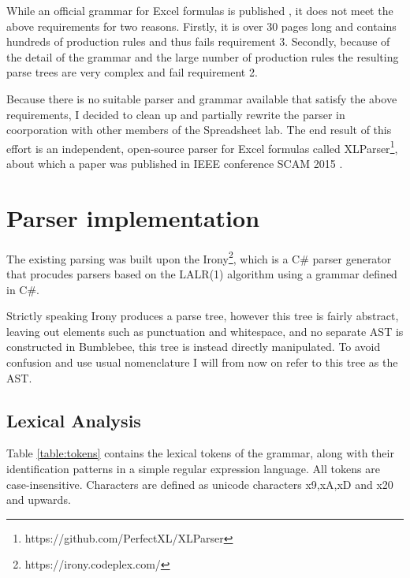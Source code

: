 While an official grammar for Excel formulas is published \cite{ExcelOfficialGrammar}, it does not meet the above requirements for two reasons.
Firstly, it is over 30 pages long and contains hundreds of production rules and thus fails requirement 3.
Secondly, because of the detail of the grammar and the large number of production rules the resulting parse trees are very complex and fail requirement 2.

Because there is no suitable parser and grammar available that satisfy the above requirements, I decided to clean up and partially rewrite the parser in coorporation with other members of the Spreadsheet lab.
The end result of this effort is an independent, open-source parser for Excel formulas called XLParser\footnote{https://github.com/PerfectXL/XLParser}, about which a paper was published in IEEE conference SCAM 2015 \cite{xlparser}.

\section{Parser implementation}

The existing parsing was built upon the Irony\footnote{https://irony.codeplex.com/}, which is a C\# parser generator that procudes parsers based on the LALR(1) algorithm using a grammar defined in C\#.

Strictly speaking Irony produces a parse tree, however this tree is fairly abstract, leaving out elements such as punctuation and whitespace, and no separate AST is constructed in Bumblebee, this tree is instead directly manipulated.
To avoid confusion and use usual nomenclature I will from now on refer to this tree as the AST.

\subsection{Lexical Analysis}
\label{sec:lexanalysis}

\begin{table}
\tiny
\centerfloat

\caption{Lexical tokens used in the XLParser grammar, as refered to in section \ref{sec:lexanalysis}.}
\label{table:tokens}
\end{table}

Table \ref{table:tokens} contains the lexical tokens of the grammar, along with their identification patterns in a simple regular expression language. All tokens are case-insensitive.
Characters are defined as unicode characters x9,xA,xD and x20 and upwards.

